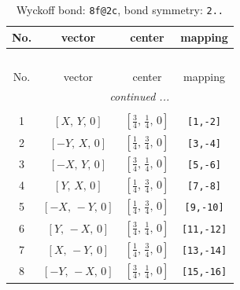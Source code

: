 \documentclass[fleqn,8pt]{jsarticle}
\begin{document}
\begin{longtable}{cccc}
\caption{Wyckoff bond: {\tt 8f@2c}, bond symmetry: {\tt 2..}}
 \\
 \hline \hline
No. & vector & center & mapping \\ \hline \endfirsthead

\multicolumn{3}{l}{\tablename\ \thetable{}} \\
 \hline \hline
No. & vector & center & mapping \\ \hline \endhead

 \hline \hline
\multicolumn{3}{r}{\footnotesize\it continued ...} \\ \endfoot

 \hline \hline
\multicolumn{3}{r}{} \\ \endlastfoot

1 & $\left[ X,\, Y,\, 0 \right]$ & $\left[ \frac{3}{4},\, \frac{1}{4},\, 0 \right]$ & {\tt [1,-2]} \\ \hline
2 & $\left[ - Y,\, X,\, 0 \right]$ & $\left[ \frac{1}{4},\, \frac{3}{4},\, 0 \right]$ & {\tt [3,-4]} \\ \hline
3 & $\left[ - X,\, Y,\, 0 \right]$ & $\left[ \frac{3}{4},\, \frac{1}{4},\, 0 \right]$ & {\tt [5,-6]} \\ \hline
4 & $\left[ Y,\, X,\, 0 \right]$ & $\left[ \frac{1}{4},\, \frac{3}{4},\, 0 \right]$ & {\tt [7,-8]} \\ \hline
5 & $\left[ - X,\, - Y,\, 0 \right]$ & $\left[ \frac{1}{4},\, \frac{3}{4},\, 0 \right]$ & {\tt [9,-10]} \\ \hline
6 & $\left[ Y,\, - X,\, 0 \right]$ & $\left[ \frac{3}{4},\, \frac{1}{4},\, 0 \right]$ & {\tt [11,-12]} \\ \hline
7 & $\left[ X,\, - Y,\, 0 \right]$ & $\left[ \frac{1}{4},\, \frac{3}{4},\, 0 \right]$ & {\tt [13,-14]} \\ \hline
8 & $\left[ - Y,\, - X,\, 0 \right]$ & $\left[ \frac{3}{4},\, \frac{1}{4},\, 0 \right]$ & {\tt [15,-16]} \\
\end{longtable}
\renewcommand{\arraystretch}{1.2}
\end{document}
